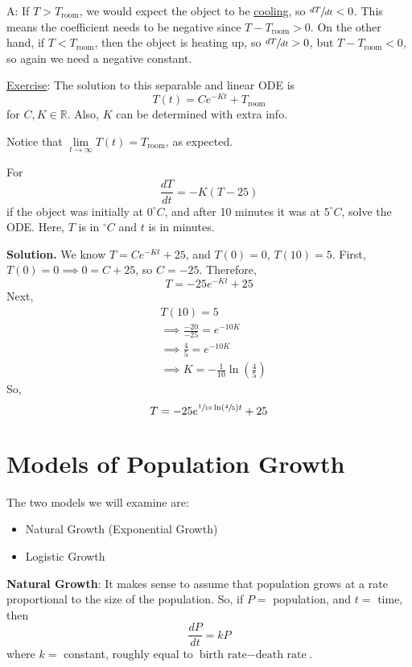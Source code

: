 A\@: If $ T>T_{\text{room}} $, we would expect the object to be \underline{cooling},
so $ \sfrac{dT}{dt} <0 $. This means the coefficient needs to be negative since
$ T-T_{\text{room}}>0 $. On the other hand, if $ T<T_{\text{room}} $,
then the object is heating up, so $ \sfrac{dT}{dt}>0 $, but
$ T-T_{\text{room}}<0 $, so again we need a negative constant.

\underline{Exercise}: The solution to this separable and linear ODE is
\[ T(t)=Ce^{-Kt}+T_{\text{room}} \]
for $ C,K\in\mathbb{R} $. Also, $ K $ can be determined with extra info.

Notice that $ \lim\limits_{{t} \to {\infty}} T(t)=T_{\text{room}} $,
as expected.

\begin{Example}{}{}
    For
    \[ \frac{dT}{dt}=-K(T-25)  \]
    if the object was initially at $ 0^\circ C $, and after
    10 minutes it was at $ 5^\circ C $, solve the ODE\@. Here,
    $ T $ is in $ ^\circ C $ and $ t $ is in minutes.

    \textbf{Solution.} We know $ T=Ce^{-Kt}+25 $, and $ T(0)=0 $,
    $ T(10)=5 $. First, $ T(0)=0\implies 0=C+25 $, so $ C=-25 $.
    Therefore,
    \[ T=-25e^{-Kt}+25 \]
    Next,
    \begin{align*}
         & T(10)=5                                               \\
         & \implies \frac{-20}{-25} =e^{-10K}                    \\
         & \implies \frac{4}{5} =e^{-10K}                        \\
         & \implies K=-\frac{1}{10}\ln\left( \frac{4}{5} \right)
    \end{align*}
    So,
    \[ T=-25e^{\sfrac{1}{10} \ln\left( \sfrac{4}{5} \right)t}+25 \]
\end{Example}

\section{Models of Population Growth}
The two models we will examine are:
\begin{itemize}
    \item Natural Growth (Exponential Growth)
    \item Logistic Growth
\end{itemize}
\textbf{Natural Growth}: It makes sense to assume that
population grows at a rate proportional to the size of the population.
So, if $ P= $ population, and $ t= $ time, then
\[ \frac{dP}{dt}=kP  \]
where $ k= $ constant, roughly equal to $ \text{birth rate}-\text{death rate} $.

